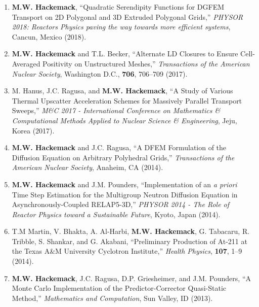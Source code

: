 \documentclass[10pt]{article}
\makeatletter
\newlength{\bibhang}
\newlength{\bibsep}
 {\@listi \global\bibsep\itemsep \global\advance\bibsep by\parsep}
\newenvironment{bibsection}%
        {\begin{enumerate}{}{%
       \setlength{\leftmargin}{\bibhang}%
       \setlength{\itemindent}{-\leftmargin}%
       \setlength{\itemsep}{\bibsep}%
       \setlength{\parsep}{\z@}%
        \setlength{\partopsep}{0pt}%
        \setlength{\topsep}{0pt}}}
        {\end{enumerate}\vspace{-.6\baselineskip}}
\makeatother
\begin{document}
\begin{bibsection}
\item \textbf{M.W. Hackemack}, ``Quadratic Serendipity Functions for DGFEM Transport on 2D Polygonal and 3D Extruded Polygonal Grids,'' \textit{PHYSOR 2018: Reactors Physics paving the way towards more efficient systems}, Cancun, Mexico (2018).

\item \textbf{M.W. Hackemack} and T.L. Becker, ``Alternate LD Closures to Ensure Cell-Averaged Positivity on Unstructured Meshes,'' \textit{Transactions of the American Nuclear Society}, Washington D.C., \textbf{706}, 706--709 (2017).

\item M. Hanus, J.C. Ragusa, and \textbf{M.W. Hackemack}, ``A Study of Various Thermal Upscatter Acceleration Schemes for Massively Parallel Transport Sweeps,'' \textit{M\&C 2017 - International Conference on Mathematics \& Computational Methods Applied to Nuclear Science \& Engineering}, Jeju, Korea (2017).

\item \textbf{M.W. Hackemack} and J.C. Ragusa, ``A DFEM Formulation of the Diffusion Equation on Arbitrary Polyhedral Grids,'' \textit{Transactions of the American Nuclear Society}, Anaheim, CA (2014).

\item \textbf{M.W. Hackemack} and J.M. Pounders, ``Implementation of an \textit{a priori} Time Step Estimation for the Multigroup Neutron Diffusion Equation in Asynchronously-Coupled RELAP5-3D,'' \textit{PHYSOR 2014 - The Role of Reactor Physics toward a Sustainable Future}, Kyoto, Japan (2014).

\item T.M Martin, V. Bhakta, A. Al-Harbi, \textbf{M.W. Hackemack}, G. Tabacaru, R. Tribble, S. Shankar, and G. Akabani, ``Preliminary Production of At-211 at the Texas A\&M University Cyclotron Institute,'' \textit{Health Physics}, \textbf{107}, 1--9 (2014).

\item \textbf{M.W. Hackemack}, J.C. Ragusa, D.P. Griesheimer, and J.M. Pounders, ``A Monte Carlo Implementation of the Predictor-Corrector Quasi-Static Method,'' \textit{Mathematics and Computation}, Sun Valley, ID (2013).

\end{bibsection}

\end{document}
